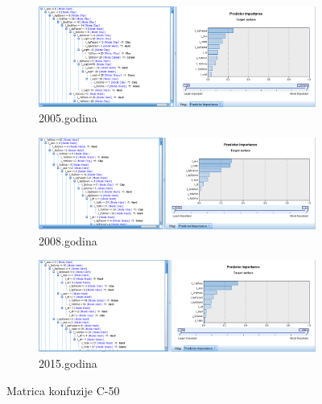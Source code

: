 \documentclass[a4paper]{article}
\begin{document}
\begin{figure}[H]
	\begin{subfigure}[h]{\textwidth}
		\begin{center}
			\includegraphics[scale=0.50]{Klasifikacija/C50/Model_Surface2005.png}
		\end{center}
		\caption{2005.godina}
		\label{fig:ModelKlasifikacijaC502005}
	\end{subfigure}
	
	\vspace{0.5cm}
	\begin{subfigure}[h]{\textwidth}
		\begin{center}
			\includegraphics[scale=0.50]{Klasifikacija/C50/Model_Surface2008.png}
		\end{center}
		\caption{2008.godina}
		\label{fig:ModelKlasifikacijaC502008}
	\end{subfigure}
	
	\vspace{0.5cm}
	\begin{subfigure}[h]{\textwidth}
		\begin{center}
			\includegraphics[scale=0.50]{Klasifikacija/C50/Model_Surface2015.png}
		\end{center}
		\caption{2015.godina}
		\label{fig:ModelKlasifikacijaC502015}
	\end{subfigure}
	
	\caption{Matrica konfuzije C-50}
	\label{fig:ModelKlasifikacijaC50}
\end{figure}
\end{document}

